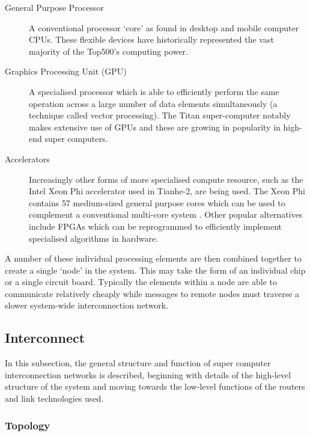 			\begin{description}
				
				\item[General Purpose Processor] A conventional processor `core' as
				found in desktop and mobile computer CPUs. These flexible devices have
				historically represented the vast majority of the Top500's computing
				power.
				
				\item[Graphics Processing Unit (GPU)] A specialised processor which is
				able to efficiently perform the same operation across a large number of
				data elements simultaneously (a technique called vector processing). The
				Titan super-computer notably makes extensive use of GPUs \cite{bland12}
				and these are growing in popularity in high-end super computers.
				
				\item[Accelerators] Increasingly other forms of more specialised compute
				resource, such as the Intel Xeon Phi accelerator used in Tianhe-2, are
				being used. The Xeon Phi contains 57 medium-sized general purpose cores
				which can be used to complement a conventional multi-core system
				\cite{dongarra13}. Other popular alternatives include FPGAs which can be
				reprogrammed to efficiently implement specialised algorithms in
				hardware.
				
			\end{description}
			
			A number of these individual processing elements are then combined
			together to create a single `node' in the system. This may take the form
			of an individual chip or a single circuit board. Typically the elements
			within a node are able to communicate relatively cheaply while messages to
			remote nodes must traverse a slower system-wide interconnection network.
		
		\subsection{Interconnect}
			
			In this subsection, the general structure and function of super computer
			interconnection networks is described, beginning with details of the
			high-level structure of the system and moving towards the low-level
			functions of the routers and link technologies used.
			
			\subsubsection{Topology}
				

